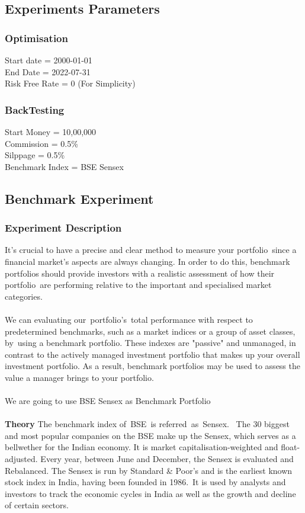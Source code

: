 \subsection{Experiments Parameters}
\subsubsection{Optimisation}
Start date = 2000-01-01\\
End Date = 2022-07-31\\
Risk Free Rate = 0 (For Simplicity)
\subsubsection{BackTesting}
Start Money = 10,00,000\\
Commission = 0.5\%\\
Silppage = 0.5\%\\
Benchmark Index = BSE Sensex\\

\subsection{Benchmark Experiment}
\subsubsection{Experiment Description}
It's crucial to have a precise and clear method to measure your portfolio since a financial market's aspects are always changing. In order to do this, benchmark portfolios should provide investors with a realistic assessment of how their portfolio are performing relative to the important and specialised market categories.\\\\
We can evaluating our portfolio's total performance with respect to predetermined benchmarks, such as a market indices or a group of asset classes, by using a benchmark portfolio. These indexes are "passive" and unmanaged, in contrast to the actively managed investment portfolio that makes up your overall investment portfolio. As a result, benchmark portfolios may be used to assess the value a manager brings to your portfolio.\\\\
We are going to use BSE Sensex as Benchmark Portfolio\\\\
\textbf{Theory}
The benchmark index of BSE is referred as Sensex.  The 30 biggest and most popular companies on the BSE make up the Sensex, which serves as a bellwether for the Indian economy. It is market capitalisation-weighted and float-adjusted. Every year, between June and December, the Sensex is evaluated and Rebalanced. The Sensex is run by Standard \& Poor's and is the earliest known stock index in India, having been founded in 1986. It is used by analysts and investors to track the economic cycles in India as well as the growth and decline of certain sectors.

